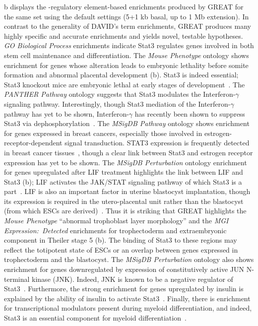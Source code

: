 b displays the \cis-regulatory element-based enrichments 
produced by GREAT for the same set using the default settings (5+1 kb basal, up to 1 Mb extension).
%
In contrast to the generality of DAVID's term enrichments, GREAT produces many highly
specific and accurate enrichments and yields novel, testable hypotheses.
%
\emph{GO Biological Process} enrichments indicate
Stat3 regulates genes involved in both stem cell maintenance and differentiation.
%
The \emph{Mouse Phenotype} ontology shows enrichment for genes whose alteration
leads to embryonic lethality before somite formation and abnormal placental
development (b).  Stat3 is indeed essential; Stat3 knockout mice are
embryonic lethal at early stages of development~\citep{Takeda1997}.
The \emph{PANTHER Pathway} ontology suggests that Stat3 modulates the
Interferon-$\gamma$ signaling pathway.
Interestingly, though Stat3 mediation of the Interferon-$\gamma$ pathway has
yet to be shown, Interferon-$\gamma$ has recently been shown to suppress Stat3 via
dephosphorylation~\citep{Fang2006}.
%
The \emph{MSigDB Pathway} ontology shows enrichment for genes expressed in
breast cancers, especially those involved in estrogen-receptor-dependent
signal transduction.  STAT3 expression is frequently detected in breast
cancer tissues~\citep{Hsieh2005}, though a clear link between Stat3 and
estrogen receptor expression has yet to be shown.
%
The \emph{MSigDB Perturbation}
ontology enrichment for genes upregulated after LIF treatment highlights the
link between LIF and Stat3 (b); LIF activates the JAK/STAT signaling
pathway of which Stat3 is a part~\citep{Kisseleva2002}.
LIF is also an important factor in
uterine blastocyst implantation, though its expression is required in the utero-placental unit
rather than the blastocyst (from which ESCs are derived)~\citep{Auernhammer2000}.
Thus it is striking that GREAT highlights the \emph{Mouse Phenotype} ``abnormal trophoblast layer
morphology'' and the \emph{MGI Expression:\ Detected} enrichments for trophectoderm and extraembryonic
component in Theiler stage 5 (b).  The binding of Stat3 to these regions
may reflect the totipotent state of ESCs or an overlap between genes expressed in trophectoderm and the
blastocyst.
The \emph{MSigDB Perturbation}
ontology also shows enrichment for genes downregulated by expression of constitutively
active JUN N-terminal kinase (JNK).  Indeed, JNK is known to be a negative regulator of Stat3~\citep{Lim1999}.
Furthermore, the strong enrichment for genes upregulated by insulin is explained by the
ability of insulin to activate Stat3~\citep{Coffer1997}.
Finally, there is enrichment for transcriptional modulators present during myeloid differentiation, and
indeed, Stat3 is an essential component for myeloid differentiation~\citep{McLemore2001}.
%

